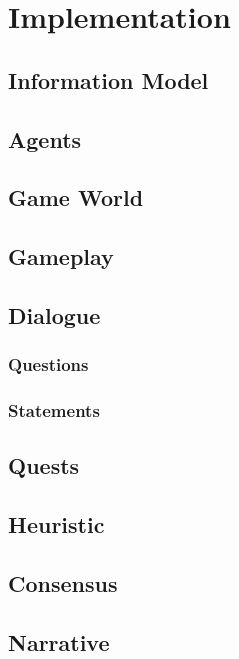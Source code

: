 \chapter{Implementation} %

\section{Information Model}
\section{Agents}
\section{Game World}
\section{Gameplay}
\section{Dialogue}
\subsection{Questions}
\subsection{Statements}
\section{Quests}
\section{Heuristic}
\section{Consensus}
\section{Narrative}
